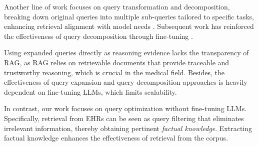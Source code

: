 Another line of work focuses on query transformation and decomposition, breaking down original queries into multiple sub-queries tailored to specific tasks, enhancing retrieval alignment with model needs \cite{dhuliawala2023chain}. Subsequent work has reinforced the effectiveness of query decomposition through fine-tuning \cite{ma2023query}.

Using expanded queries directly as reasoning evidence lacks the transparency of RAG, as RAG relies on retrievable documents that provide traceable and trustworthy reasoning, which is crucial in the medical field.
Besides, the effectiveness of query expansion and query decomposition approaches is heavily dependent on fine-tuning LLMs, which limits scalability.


In contrast, our work focuses on query optimization without fine-tuning LLMs. Specifically, retrieval from EHRs can be seen as query filtering that eliminates irrelevant information, thereby obtaining pertinent \textit{factual knowledge}. Extracting factual knowledge enhances the effectiveness of retrieval from the corpus.




